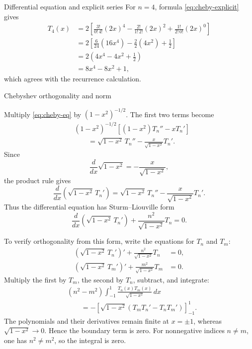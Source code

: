 \documentclass[11pt]{beamer}
\begin{document}
\begin{frame}[allowframebreaks]{Differential equation and explicit series}
For $n=4$, formula \eqref{eq:cheby-explicit} gives
\begin{align*}
  T_4(x)
   &=
    2\left[
      \frac{3!}{0!\,4!}(2x)^4
      -\frac{2!}{1!\,2!}(2x)^2
      +\frac{1!}{2!\,0!}(2x)^0
    \right]\\
   &=
    2\left[
      \frac{6}{24}(16x^4)
      -\frac{2}{2}(4x^2)
      +\frac{1}{2}
    \right]\\
   &=
    2\left(4x^4-4x^2+\frac12\right)\\
   &=8x^4-8x^2+1,
\end{align*}
which agrees with the recurrence calculation.
\end{frame}

\begin{frame}[allowframebreaks]{Chebyshev orthogonality and norm}
\footnotesize

Multiply \eqref{eq:cheby-eq} by $(1-x^2)^{-1/2}$.  The first two terms become
\begin{align*}
  &(1-x^2)^{-1/2}
    \left[(1-x^2)T_n''-xT_n'\right]\\
  &\qquad=
    \sqrt{1-x^2}\,T_n''
    -\frac{x}{\sqrt{1-x^2}}T_n'.
\end{align*}
Since
\[
  \frac{d}{dx}\sqrt{1-x^2}
    =-\frac{x}{\sqrt{1-x^2}},
\]
the product rule gives
\[
  \frac{d}{dx}
    \left(\sqrt{1-x^2}\,T_n'\right)
   =
    \sqrt{1-x^2}\,T_n''
    -\frac{x}{\sqrt{1-x^2}}T_n'.
\]
Thus the differential equation has Sturm--Liouville form
\begin{equation}
  \frac{d}{dx}
    \left(\sqrt{1-x^2}\,T_n'\right)
  +\frac{n^2}{\sqrt{1-x^2}}T_n=0.
  \label{eq:cheby-sl}
\end{equation}

To verify orthogonality from this form, write the equations for $T_n$ and $T_m$:
\begin{align*}
  \left(\sqrt{1-x^2}\,T_n'\right)'
    +\frac{n^2}{\sqrt{1-x^2}}T_n&=0,\\
  \left(\sqrt{1-x^2}\,T_m'\right)'
    +\frac{m^2}{\sqrt{1-x^2}}T_m&=0.
\end{align*}
Multiply the first by $T_m$, the second by $T_n$, subtract, and integrate:
\begin{align*}
  &(n^2-m^2)
    \int_{-1}^{1}
      \frac{T_n(x)T_m(x)}{\sqrt{1-x^2}}\,dx\\
  &\qquad=
  -\left[
    \sqrt{1-x^2}
    \left(T_mT_n'-T_nT_m'\right)
  \right]_{-1}^{1}.
\end{align*}
The polynomials and their derivatives remain finite at $x=\pm1$, whereas
$\sqrt{1-x^2}\to0$.  Hence the boundary term is zero.  For nonnegative
indices $n\ne m$, one has $n^2\ne m^2$, so the integral is zero.


\end{frame}
\end{document}
